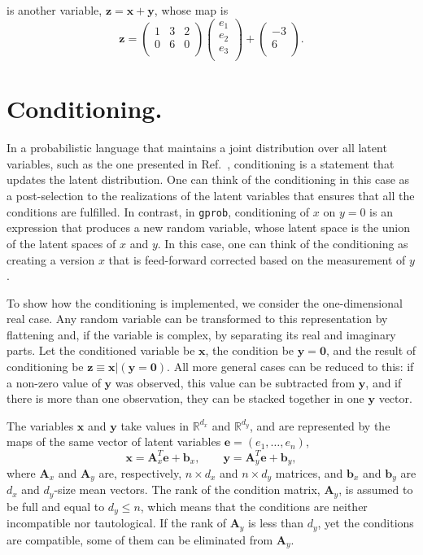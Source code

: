 \documentclass[a4paper,notitlepage]{article}
\renewcommand{\b}[1]{\mathbf{#1}}
\begin{document}
is another variable, $\b{z}=\b{x}+\b{y}$, whose map is
\begin{equation}
\b{z}=
\begin{pmatrix}
1 & 3 & 2\\
0 & 6 & 0\\
\end{pmatrix}
\begin{pmatrix}
e_1\\
e_2\\
e_3\\
\end{pmatrix}
+
\begin{pmatrix}
-3\\
6\\
\end{pmatrix}.
\end{equation}


\section{Conditioning.}
\label{sec:conditioning}

In a probabilistic language that maintains a joint distribution over all latent variables, such as the one presented in Ref.~\cite{stein_compositional_2021}, conditioning is a statement that updates the latent distribution. One can think of the conditioning in this case as a post-selection to the realizations of the latent variables that ensures that all the conditions are fulfilled. In contrast, in \texttt{gprob}, conditioning of $x$ on $y=0$ is an expression that produces a new random variable, whose latent space is the union of the latent spaces of $x$ and $y$. 
In this case, one can think of the conditioning as creating a version $x$ that is feed-forward corrected based on the measurement of $y$.


To show how the conditioning is implemented, we consider the one-dimensional real case. Any random variable can be transformed to this representation by flattening and, if the variable is complex, by separating its real and imaginary parts. Let the conditioned variable be $\b{x}$, the condition be $\b{y}=\b{0}$, and the result of conditioning be $\b{z}\equiv\b{x}|(\b{y}=\b{0})$. All more general cases can be reduced to this: if a non-zero value of $\b{y}$ was observed, this value can be subtracted from $\b{y}$, and if there is more than one observation, they can be stacked together in one $\b{y}$ vector.

The variables $\b{x}$ and $\b{y}$ take values in $\mathbb{R}^{d_x}$ and $\mathbb{R}^{d_y}$, and are represented by the maps of the same vector of latent variables $\b{e}=(e_1,\ldots,e_n)$,
\begin{equation}
\b{x}=\b{A}_x^T\b{e} + \b{b}_x,\qquad
\b{y}=\b{A}_y^T\b{e} + \b{b}_y,
\end{equation}
where $\b{A}_x$ and $\b{A}_y$ are, respectively, $n\times d_x$ and $n\times d_y$ matrices, and $\b{b}_x$ and $\b{b}_y$ are $d_x$ and $d_y$-size mean vectors. The rank of the condition matrix, $\b{A}_y$, is assumed to be full and equal to $d_y\le n$, which means that the conditions are neither incompatible nor tautological. If the rank of $\b{A}_y$ is less than $d_y$, yet the conditions are compatible, some of them can be eliminated from $\b{A}_y$.
\end{document}
